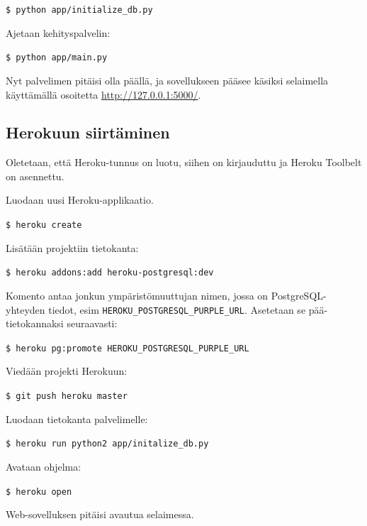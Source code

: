 \documentclass{article}
\begin{document}
\texttt{\$ python app/initialize\_db.py}

Ajetaan kehityspalvelin:

\texttt{\$ python app/main.py}

Nyt palvelimen pitäisi olla päällä, ja sovellukseen pääsee käsiksi selaimella käyttämällä osoitetta \url{http://127.0.0.1:5000/}.

\subsection{Herokuun siirtäminen}

Oletetaan, että Heroku-tunnus on luotu, siihen on kirjauduttu ja Heroku Toolbelt on asennettu.

Luodaan uusi Heroku-applikaatio.

\texttt{\$ heroku create}

Lisätään projektiin tietokanta:

\texttt{\$ heroku addons:add heroku-postgresql:dev}

Komento antaa jonkun ympäristömuuttujan nimen, jossa on PostgreSQL-yhteyden tiedot, esim \verb+HEROKU_POSTGRESQL_PURPLE_URL+. Asetetaan se pää-tietokannaksi seuraavasti:

\texttt{\$ heroku pg:promote HEROKU\_POSTGRESQL\_PURPLE\_URL}

Viedään projekti Herokuun:

\texttt{\$ git push heroku master}

Luodaan tietokanta palvelimelle:

\texttt{\$ heroku run python2 app/initalize\_db.py}

Avataan ohjelma:

\texttt{\$ heroku open}

Web-sovelluksen pitäisi avautua selaimessa.
\end{document}
